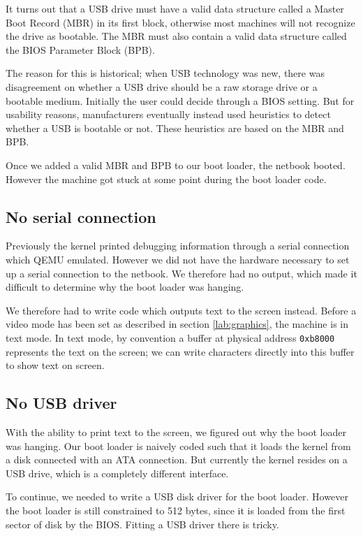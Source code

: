 \documentclass{article}
\begin{document}
It turns out that a USB drive must have a valid data structure called a Master
Boot Record (MBR) in its first block, otherwise most machines will not
recognize the drive as bootable. The MBR must also contain a valid data
structure called the BIOS Parameter Block (BPB).

The reason for this is historical; when USB technology was new, there was
disagreement on whether a USB drive should be a raw storage drive or a
bootable medium. Initially the user could decide through a BIOS setting. But
for usability reasons, manufacturers eventually instead used heuristics to
detect whether a USB is bootable or not. These heuristics are based on the
MBR and BPB.

Once we added a valid MBR and BPB to our boot loader, the netbook booted.
However the machine got stuck at some point during the boot loader code.


\subsection{No serial connection}
Previously the kernel printed debugging information through a serial
connection which QEMU emulated. However we did not have the hardware necessary
to set up a serial connection to the netbook. We therefore had no output,
which made it difficult to determine why the boot loader was hanging.

We therefore had to write code which outputs text to the screen instead.
Before a video mode has been set as described in section \ref{lab:graphics},
the machine is in text mode. In text mode, by convention a buffer at physical
address \texttt{0xb8000} represents the text on the screen; we can write characters
directly into this buffer to show text on screen.


\subsection{No USB driver}
With the ability to print text to the screen, we figured out why the boot
loader was hanging. Our boot loader is naively coded such that it loads the
kernel from a disk connected with an ATA connection. But currently the kernel
resides on a USB drive, which is a completely different interface.

To continue, we needed to write a USB disk driver for the boot loader. However
the boot loader is still constrained to 512 bytes, since it is loaded from the
first sector of disk by the BIOS. Fitting a USB driver there is tricky.
\end{document}

